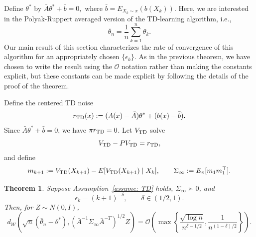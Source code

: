 \documentclass[11pt]{article}
\newtheorem{theorem}{Theorem}
\begin{document}
Define $\theta^*$ by $\bar{A}\theta^*+\bar{b}=0,$ where $\bar{b}=E_{X_k\sim\pi}(b(X_k)).$  Here, we are interested in the Polyak-Ruppert averaged version of the TD-learning algorithm, i.e.,
$$\bar{\theta}_n=\frac{1}{n}\sum_{k=1}^{n} \theta_k.$$ Our main result of this section characterizes the rate of convergence of this algorithm for an appropriately chosen $\{\epsilon_k\}$. As in the previous theorem, we have chosen to write the result using the $\mathcal{O}$ notation rather than making the constants explicit, but these constants can be made explicit by following the details of the proof of the theorem. 


Define the centered TD noise
\begin{equation}\label{eq: TD reward}
    r_{\rm TD}(x)
    :=
    (A(x)-\bar A)\theta^*+(b(x)-\bar b).
\end{equation}
Since $\bar A\theta^*+\bar b=0$, we have $\pi r_{\rm TD}=0$. Let
$V_{\rm TD}$ solve
\[
    V_{\rm TD}-PV_{\rm TD}=r_{\rm TD},
\]
and define
\begin{equation}\label{eq: TD asymptotic covariance}
    m_{k+1}
    :=
    V_{\rm TD}(X_{k+1})
    -E[V_{\rm TD}(X_{k+1})\mid X_k],
    \qquad
    \Sigma_\infty
    :=
    E_\pi[m_1m_1^\top].
\end{equation}

\begin{theorem}\label{thm: TD CLT}
Suppose Assumption~\ref{assume: TD} holds, $\Sigma_\infty\succ0$, and
\[
    \epsilon_k=(k+1)^{-\delta},
    \qquad
    \delta\in(1/2,1).
\]
Then, for $Z\sim N(0,I)$,
\[
 d_\mathcal{W}\!\left(
    \sqrt n(\bar\theta_n-\theta^*),
    (\bar A^{-1}\Sigma_\infty\bar A^{-T})^{1/2}Z
 \right)
 =
 \mathcal O\!\left(
    \max\left\{
        \frac{\sqrt{\log n}}{n^{\delta-1/2}},
        \frac1{n^{(1-\delta)/2}}
    \right\}
 \right).
\]
\end{theorem}
\end{document}
